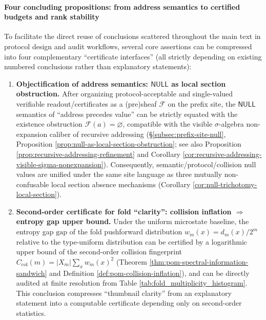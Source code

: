 \paragraph{Four concluding propositions: from address semantics to certified budgets and rank stability}
To facilitate the direct reuse of conclusions scattered throughout the main text in protocol design and audit workflows, several core assertions can be compressed into four complementary ``certificate interfaces'' (all strictly depending on existing numbered conclusions rather than explanatory statements):
\begin{enumerate}
  \item \textbf{Objectification of address semantics: \(\mathsf{NULL}\) as local section obstruction.}
  After organizing protocol-acceptable and single-valued verifiable readout/certificates as a (pre)sheaf \(\mathscr F\) on the prefix site, the \(\mathsf{NULL}\) semantics of ``address precedes value'' can be strictly equated with the existence obstruction \(\mathscr F(a)=\varnothing\), compatible with the visible \(\sigma\)-algebra non-expansion caliber of recursive addressing (\S\ref{subsec:prefix-site-null}, Proposition \ref{prop:null-as-local-section-obstruction}; see also Proposition \ref{prop:recursive-addressing-refinement} and Corollary \ref{cor:recursive-addressing-visible-sigma-nonexpansion}).
  Consequently, semantic/protocol/collision null values are unified under the same site language as three mutually non-confusable local section absence mechanisms (Corollary \ref{cor:null-trichotomy-local-section}).

  \item \textbf{Second-order certificate for fold ``clarity'': collision inflation \(\Rightarrow\) entropy gap upper bound.}
  Under the uniform microstate baseline, the entropy gap \(\mathrm{gap}\) of the fold pushforward distribution \(w_m(x)=d_m(x)/2^m\) relative to the type-uniform distribution can be certified by a logarithmic upper bound of the second-order collision fingerprint
  \(C_{\mathrm{col}}(m)=|X_m|\sum_x w_m(x)^2\)
  (Theorem \ref{thm:pom-spectral-information-sandwich} and Definition \ref{def:pom-collision-inflation}), and can be directly audited at finite resolution from Table \ref{tab:fold_multiplicity_histogram}.
  This conclusion compresses ``thumbnail clarity'' from an explanatory statement into a computable certificate depending only on second-order statistics.


\end{enumerate}
